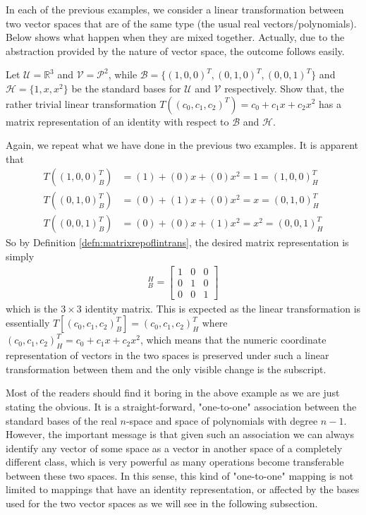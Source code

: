In each of the previous examples, we consider a linear transformation between two vector spaces that are of the same type (the usual real vectors/polynomials). Below shows what happen when they are mixed together. Actually, due to the abstraction provided by the nature of vector space, the outcome follows easily.
\begin{exmp}
Let $\mathcal{U} = \mathbb{R}^3$ and $\mathcal{V} = \mathcal{P}^2$, while $\mathcal{B} = \{(1,0,0)^T, (0,1,0)^T, (0,0,1)^T\}$ and $\mathcal{H} = \{1, x, x^2\}$ be the standard bases for $\mathcal{U}$ and $\mathcal{V}$ respectively. Show that, the rather trivial linear transformation $T((c_0, c_1, c_2)^T) = c_0 + c_1x + c_2x^2$ has a matrix representation of an identity with respect to $\mathcal{B}$ and $\mathcal{H}$.
\end{exmp}
\begin{solution}
Again, we repeat what we have done in the previous two examples. It is apparent that
\begin{align*}
T((1,0,0)^T_B) &= (1) + (0)x + (0)x^2 = 1 = (1,0,0)^T_H\\
T((0,1,0)^T_B) &= (0) + (1)x + (0)x^2 = x = (0,1,0)^T_H\\
T((0,0,1)^T_B) &= (0) + (0)x + (1)x^2 = x^2 = (0,0,1)^T_H
\end{align*}
So by Definition \ref{defn:matrixrepoflintrans}, the desired matrix representation is simply
\begin{align*}
[T]_B^H = 
\begin{bmatrix}
1 & 0 & 0 \\
0 & 1 & 0 \\
0 & 0 & 1
\end{bmatrix}
\end{align*}
which is the $3 \times 3$ identity matrix. This is expected as the linear transformation is essentially $T[(c_0, c_1, c_2)_B^T] = (c_0, c_1, c_2)_H^T$ where $(c_0, c_1, c_2)_H^T = c_0 + c_1x + c_2x^2$, which means that the numeric coordinate representation of vectors in the two spaces is preserved under such a linear transformation between them and the only visible change is the subscript.
\end{solution}
Most of the readers should find it boring in the above example as we are just stating the obvious. It is a straight-forward, "one-to-one" association between the standard bases of the real $n$-space and space of polynomials with degree $n-1$. However, the important message is that given such an association we can always identify any vector of some space as a vector in another space of a completely different class, which is very powerful as many operations become transferable between these two spaces. In this sense, this kind of "one-to-one" mapping is not limited to mappings that have an identity representation, or affected by the bases used for the two vector spaces as we will see in the following subsection.

